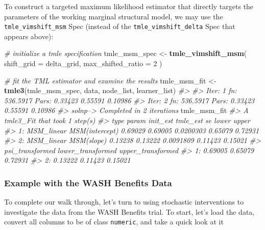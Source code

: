 \documentclass[12pt, krantz2,]{krantz}
\newenvironment{Shaded}{\begin{snugshade}}{\end{snugshade}}
\newcommand{\CommentTok}[1]{\textcolor[rgb]{0.37,0.37,0.37}{\textit{#1}}}
\newcommand{\DataTypeTok}[1]{\textcolor[rgb]{0.27,0.27,0.27}{#1}}
\newcommand{\DecValTok}[1]{\textcolor[rgb]{0.06,0.06,0.06}{#1}}
\newcommand{\KeywordTok}[1]{\textcolor[rgb]{0.27,0.27,0.27}{\textbf{#1}}}
\newcommand{\NormalTok}[1]{#1}
\newcommand{\StringTok}[1]{\textcolor[rgb]{0.5,0.5,0.5}{#1}}
\theoremstyle{definition}
\theoremstyle{definition}
\theoremstyle{definition}
\newcommand{\1}{\mathbbm{1}}
\begin{document}
To construct a targeted maximum likelihood estimator that directly targets the
parameters of the working marginal structural model, we may use the
\texttt{tmle\_vimshift\_msm} Spec (instead of the \texttt{tmle\_vimshift\_delta} Spec that
appears above):

\begin{Shaded}
\begin{Highlighting}[]
\CommentTok{# initialize a tmle specification}
\NormalTok{tmle_msm_spec <-}\StringTok{ }\KeywordTok{tmle_vimshift_msm}\NormalTok{(}
  \DataTypeTok{shift_grid =}\NormalTok{ delta_grid,}
  \DataTypeTok{max_shifted_ratio =} \DecValTok{2}
\NormalTok{)}

\CommentTok{# fit the TML estimator and examine the results}
\NormalTok{tmle_msm_fit <-}\StringTok{ }\KeywordTok{tmle3}\NormalTok{(tmle_msm_spec, data, node_list, learner_list)}
\CommentTok{#> }
\CommentTok{#> Iter: 1 fn: 536.5917  Pars:  0.33423 0.55591 0.10986}
\CommentTok{#> Iter: 2 fn: 536.5917  Pars:  0.33423 0.55591 0.10986}
\CommentTok{#> solnp--> Completed in 2 iterations}
\NormalTok{tmle_msm_fit}
\CommentTok{#> A tmle3_Fit that took 1 step(s)}
\CommentTok{#>          type          param init_est tmle_est        se   lower   upper}
\CommentTok{#> 1: MSM_linear MSM(intercept)  0.69029  0.69005 0.0200303 0.65079 0.72931}
\CommentTok{#> 2: MSM_linear     MSM(slope)  0.13238  0.13222 0.0091809 0.11423 0.15021}
\CommentTok{#>    psi_transformed lower_transformed upper_transformed}
\CommentTok{#> 1:         0.69005           0.65079           0.72931}
\CommentTok{#> 2:         0.13222           0.11423           0.15021}
\end{Highlighting}
\end{Shaded}

\hypertarget{example-with-the-wash-benefits-data}{%
\subsubsection{Example with the WASH Benefits Data}\label{example-with-the-wash-benefits-data}}

To complete our walk through, let's turn to using stochastic interventions to
investigate the data from the WASH Benefits trial. To start, let's load the
data, convert all columns to be of class \texttt{numeric}, and take a quick look at it
\end{document}

